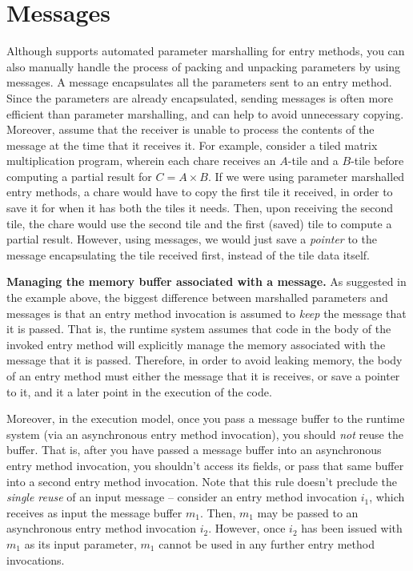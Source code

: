\section{Messages}

\label{messages}
Although \charmpp{} supports automated parameter marshalling for entry methods,
you can also manually handle the process of packing and unpacking parameters by
using messages. 
A message encapsulates all the parameters sent to an
entry method.  Since the parameters are already encapsulated,
sending messages is often more efficient than parameter marshalling, and
can help to avoid unnecessary copying.
Moreover, assume that the receiver is unable to process the contents of the
message at the time that it receives it. For example, consider a 
tiled matrix multiplication program, wherein each chare receives an $A$-tile
and a $B$-tile before computing a partial result for $C = A \times B$. If we 
were using parameter marshalled entry methods, a chare would have to copy the first
tile it received, in order to save it for when it has both the tiles it needs. 
Then, upon receiving the second
tile, the chare would use the second tile and the first (saved) tile to 
compute a partial result. However, using messages, we would just save a {\em pointer} 
to the message encapsulating the tile received first, instead of the tile data itself.

\vspace{0.1in}
\noindent
{\bf Managing the memory buffer associated with a message.}
As suggested in the example above, the biggest difference between marshalled parameters and messages
is that an entry method invocation is assumed to {\em keep} the message that it
is passed. That is, the \charmpp{} runtime system assumes that code in the body of the invoked
entry method will explicitly manage the memory associated with the message that it is passed. Therefore,
in order to avoid leaking memory, the body of an entry method must either  the message that
it is receives, or save a pointer to it, and  it a later point in the execution of the code.

Moreover, in the \charm{} execution model, once you pass a message buffer to the runtime system (via 
an asynchronous entry method invocation), you should {\em not} reuse the buffer. That is, after you have
passed a message buffer into an asynchronous entry method invocation, you shouldn't 
access its fields, or pass that same buffer into a second entry method invocation. Note that this rule
doesn't preclude the {\em single reuse} of an input message -- consider an entry method invocation
$i_1$, which receives as input the message buffer $m_1$. Then, $m_1$ may be passed to an 
asynchronous entry method invocation $i_2$. However, once $i_2$ has been issued with $m_1$ as its input
parameter, $m_1$ cannot be used in any further entry method invocations.
 
